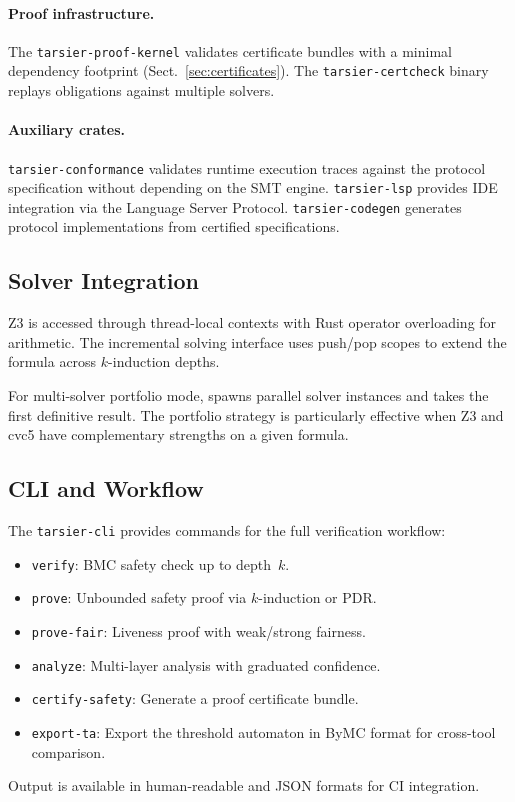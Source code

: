 \paragraph{Proof infrastructure.}
The \texttt{tarsier-proof-kernel} validates certificate bundles with a
minimal dependency footprint (Sect.~\ref{sec:certificates}).  The
\texttt{tarsier-certcheck} binary replays obligations against multiple
solvers.

\paragraph{Auxiliary crates.}
\texttt{tarsier-conformance} validates runtime execution traces
against the protocol specification without depending on the SMT
engine.  \texttt{tarsier-lsp} provides IDE integration via the
Language Server Protocol.  \texttt{tarsier-codegen} generates
protocol implementations from certified specifications.

\subsection{Solver Integration}

Z3 is accessed through thread-local contexts with Rust operator
overloading for arithmetic.  The incremental solving interface uses
push/pop scopes to extend the formula across $k$-induction depths.

For multi-solver portfolio mode, \tarsier{} spawns parallel solver
instances and takes the first definitive result.  The portfolio
strategy is particularly effective when Z3 and cvc5 have
complementary strengths on a given formula.

\subsection{CLI and Workflow}

The \texttt{tarsier-cli} provides commands for the full verification
workflow:
\begin{itemize}
  \item \texttt{verify}: BMC safety check up to depth~$k$.
  \item \texttt{prove}: Unbounded safety proof via $k$-induction or
    PDR\@.
  \item \texttt{prove-fair}: Liveness proof with weak/strong fairness.
  \item \texttt{analyze}: Multi-layer analysis with graduated
    confidence.
  \item \texttt{certify-safety}: Generate a proof certificate bundle.
  \item \texttt{export-ta}: Export the threshold automaton in ByMC
    format for cross-tool comparison.
\end{itemize}

Output is available in human-readable and JSON formats for CI
integration.

